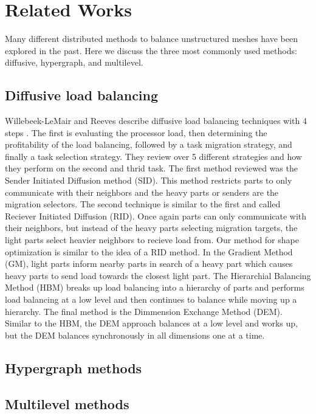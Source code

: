 \documentclass{thesis}
\begin{document}
\chapter{Related Works}

Many different distributed methods to balance unstructured meshes have been explored in the 
past. Here we discuss the three most commonly used methods: diffusive, hypergraph, 
and multilevel.

\section{Diffusive load balancing}
Willebeek-LeMair and Reeves describe diffusive load balancing techniques with 
4 steps \cite{loadbalance}. The first is evaluating the processor load, then 
determining the profitability of the load balancing, followed by a task 
migration strategy, and finally a task selection strategy. They review over 5 
different strategies and how they perform on the second and thrid task. The first 
method reviewed was the Sender Initiated Diffusion method (SID). This method 
restricts parts to only communicate with their neighbors and the heavy parts or 
senders are the migration selectors. The second technique is similar to the first 
and called Reciever Initiated Diffusion (RID). Once again parts can only 
communicate with their neighbors, but instead of the heavy parts selecting 
migration targets, the light parts select heavier neighbors to recieve load from. 
Our method for shape optimization is similar to the idea of a RID method. In the 
Gradient Method (GM), light parts inform nearby parts in search of a heavy part 
which causes heavy parts to send load towards the closest light part. The 
Hierarchial Balancing Method (HBM) breaks up load balancing into a hierarchy of 
parts and performs load balancing at a low level and then continues to balance 
while moving up a hierarchy. The final method is the Dimmension Exchange Method
 (DEM). Similar to the HBM, the DEM approach balances at a low level and works 
up, but the DEM balances synchronously in all dimensions one at a time.

\section{Hypergraph methods}

\section{Multilevel methods}
\end{document}
